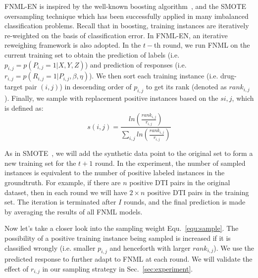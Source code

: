 \documentclass[conference]{IEEEtran}
\begin{document}
FNML-EN is inspired by the well-known boosting algorithm~\cite{Boosting}, and the SMOTE~\cite{SMOTE} oversampling technique which has been successfully applied in many imbalanced classification problems. Recall that in boosting, training instances are iteratively re-weighted on the basis of classification error. In FNML-EN, an iterative reweighing framework is also adopted. In the $t-$th round, we run FNML on the current training set to obtain the prediction of labels (i.e. $p_{i,j}=p(P_{i,j}=1|X,Y,Z)$) and prediction of responses (i.e. $r_{i,j}=p(R_{i,j}=1|P_{i,j},\beta,\eta)$). We then sort each training instance (i.e. drug-target pair $(i,j)$) in descending order of $p_{i,j}$ to get its rank (denoted as $rank_{i,j}$). Finally, we sample with replacement positive instances based on the $s{i,j}$, which is defined as:
\begin{equation}\label{equ:sample}
    s(i,j) = \frac{ln(\frac{rank_{i,j}}{r_{i,j}})}{\sum_{i,j}{ln(\frac{rank_{i,j}}{r_{i,j}})}}
\end{equation}

As in SMOTE~\cite{SMOTE}, we will add the synthetic data point to the original set to form a new training set for the $t+1$ round. In the experiment, the number of sampled instances is equivalent to the number of positive labeled instances in the groundtruth. For example, if there are $n$ positive DTI pairs in the original dataset, then in each round we will have $2\times n$ positive DTI pairs in the training set. The iteration is terminated after $I$ rounds, and the final prediction is made by averaging the results of all FNML models. 

Now let's take a closer look into the sampling weight Equ.~\ref{equ:sample}. The possibility of a positive training instance being sampled is increased if it is classified wrongly (i.e. smaller $p_{i,j}$ and henceforth with larger $rank_{i,j}$). We use the predicted response to further adapt to FNML at each round. We will validate the effect of $r_{i,j}$ in our sampling strategy in Sec.~\ref{sec:experiment}. 



%
\end{document}
